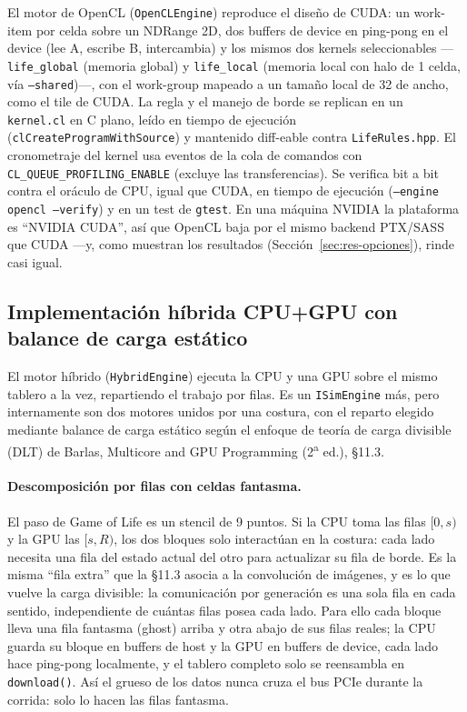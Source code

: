 \documentclass[
	spanish,
	letterpaper, oneside
]{article}
\begin{document}
El motor de OpenCL (\texttt{OpenCLEngine}) reproduce el diseño de CUDA: un
work-item por celda sobre un NDRange 2D, dos buffers de device
en ping-pong en el device (lee A, escribe B, intercambia) y los mismos
dos kernels seleccionables ---\texttt{life\_global} (memoria global) y
\texttt{life\_local} (memoria local con halo de 1 celda, vía \texttt{--shared})---,
con el work-group mapeado a un tamaño local de 32 de ancho, como el
tile de CUDA. La regla y el manejo de borde se replican en un
\texttt{kernel.cl} en C plano, leído en tiempo de ejecución
(\texttt{clCreateProgramWithSource}) y mantenido diff-eable contra
\texttt{LifeRules.hpp}. El cronometraje del kernel usa eventos de la cola de comandos
con \texttt{CL\_QUEUE\_PROFILING\_ENABLE} (excluye las transferencias). Se verifica
bit a bit contra el oráculo de CPU, igual que CUDA, en tiempo de ejecución
(\texttt{--engine opencl --verify}) y en un test de \texttt{gtest}. En una máquina
NVIDIA la plataforma es ``NVIDIA CUDA'', así que OpenCL baja por el mismo backend
PTX/SASS que CUDA ---y, como muestran los resultados
(Sección~\ref{sec:res-opciones}), rinde casi igual.

\subsection{Implementación híbrida CPU+GPU con balance de carga estático}
\label{sec:impl-hibrido}

El motor híbrido (\texttt{HybridEngine}) ejecuta la CPU y una GPU sobre el
mismo tablero a la vez, repartiendo el trabajo por filas. Es un \texttt{ISimEngine}
más, pero internamente son dos motores unidos por una costura, con el reparto
elegido mediante balance de carga estático según el enfoque de teoría
de carga divisible (DLT) de Barlas, Multicore and GPU Programming (2\textsuperscript{a}
ed.), \S11.3.

\paragraph{Descomposición por filas con celdas fantasma.} El paso de Game of Life es
un stencil de 9 puntos. Si la CPU toma las filas $[0,s)$ y la GPU las
$[s,R)$, los dos bloques solo interactúan en la costura: cada lado necesita una fila
del estado actual del otro para actualizar su fila de borde. Es la misma ``fila
extra'' que la \S11.3 asocia a la convolución de imágenes, y es lo que vuelve la
carga divisible: la comunicación por generación es una sola fila en cada
sentido, independiente de cuántas filas posea cada lado. Para ello cada bloque lleva
una fila fantasma (ghost) arriba y otra abajo de sus filas reales; la
CPU guarda su bloque en buffers de host y la GPU en buffers de
device, cada lado hace ping-pong localmente, y el tablero completo solo
se reensambla en \texttt{download()}. Así el grueso de los datos nunca cruza el bus
PCIe durante la corrida: solo lo hacen las filas fantasma.
\end{document}
